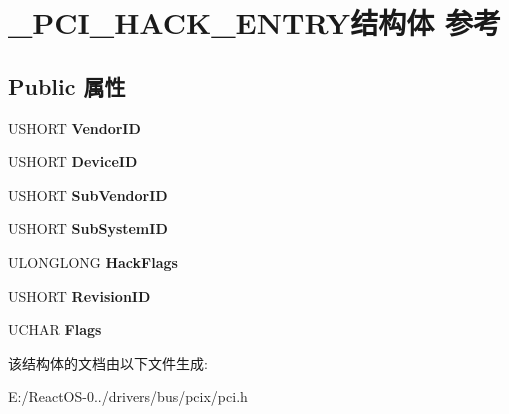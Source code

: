 \hypertarget{struct___p_c_i___h_a_c_k___e_n_t_r_y}{}\section{\+\_\+\+P\+C\+I\+\_\+\+H\+A\+C\+K\+\_\+\+E\+N\+T\+R\+Y结构体 参考}
\label{struct___p_c_i___h_a_c_k___e_n_t_r_y}
\subsection*{Public 属性}
\begin{DoxyCompactItemize}
\item 
\mbox{\label{struct___p_c_i___h_a_c_k___e_n_t_r_y_a47d3534dce739976fd6f037afeab0b8b}} 
U\+S\+H\+O\+RT {\bfseries Vendor\+ID}
\item 
\mbox{\label{struct___p_c_i___h_a_c_k___e_n_t_r_y_a8a15d062eeb33f5d481a15c4dd58c440}} 
U\+S\+H\+O\+RT {\bfseries Device\+ID}
\item 
\mbox{\label{struct___p_c_i___h_a_c_k___e_n_t_r_y_ad8a116281140dcb7d63681ae57374620}} 
U\+S\+H\+O\+RT {\bfseries Sub\+Vendor\+ID}
\item 
\mbox{\label{struct___p_c_i___h_a_c_k___e_n_t_r_y_a27fa1541eb07f000c03bd4782c93a33e}} 
U\+S\+H\+O\+RT {\bfseries Sub\+System\+ID}
\item 
\mbox{\label{struct___p_c_i___h_a_c_k___e_n_t_r_y_a0843f6b8c93746a94f88feaf39c56044}} 
U\+L\+O\+N\+G\+L\+O\+NG {\bfseries Hack\+Flags}
\item 
\mbox{\label{struct___p_c_i___h_a_c_k___e_n_t_r_y_a827de00e1a80e1e1d8ec02e1b2995505}} 
U\+S\+H\+O\+RT {\bfseries Revision\+ID}
\item 
\mbox{\label{struct___p_c_i___h_a_c_k___e_n_t_r_y_aa5e39014ef285f41eb2b6de6b3f14ba2}} 
U\+C\+H\+AR {\bfseries Flags}
\end{DoxyCompactItemize}


该结构体的文档由以下文件生成\+:\begin{DoxyCompactItemize}
\item 
E\+:/\+React\+O\+S-\/0../drivers/bus/pcix/pci.\+h\end{DoxyCompactItemize}
